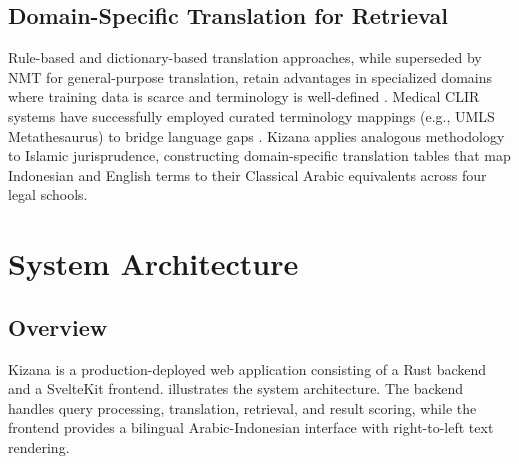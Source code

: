 \documentclass[preprint,12pt,numbers]{elsarticle}
\begin{document}
\subsection{Domain-Specific Translation for Retrieval}

Rule-based and dictionary-based translation approaches, while superseded by NMT for general-purpose translation, retain advantages in specialized domains where training data is scarce and terminology is well-defined \citep{wu2008domain}. Medical CLIR systems have successfully employed curated terminology mappings (e.g., UMLS Metathesaurus) to bridge language gaps \citep{markonis2012using}. Kizana applies analogous methodology to Islamic jurisprudence, constructing domain-specific translation tables that map Indonesian and English terms to their Classical Arabic equivalents across four legal schools.

\section{System Architecture}
\label{sec:architecture}

\subsection{Overview}

Kizana is a production-deployed web application consisting of a Rust backend and a SvelteKit frontend.  illustrates the system architecture. The backend handles query processing, translation, retrieval, and result scoring, while the frontend provides a bilingual Arabic-Indonesian interface with right-to-left text rendering.
\end{document}
